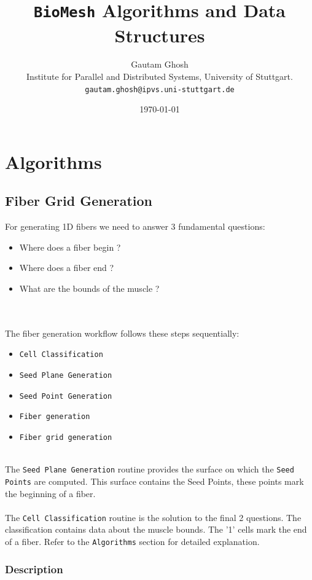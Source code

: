 \documentclass[11pt,a4paper]{article}
\title{%
  \texttt{BioMesh} Algorithms and Data Structures
}
\author{
  Gautam Ghosh\\
  \small Institute for Parallel and Distributed Systems, University of Stuttgart.\\
  \small \texttt{gautam.ghosh@ipvs.uni-stuttgart.de}
}
\date{\today}
\begin{document}
\maketitle

\section{Algorithms}

\subsection{Fiber Grid Generation}

For generating 1D fibers we need to answer 3 fundamental questions:
\begin{itemize}
    \item Where does a fiber begin ?
    \item Where does a fiber end ?
    \item What are the bounds of the muscle ?
\end{itemize}
\\
\\
The fiber generation workflow follows these steps sequentially:

\begin{itemize}
    \item \texttt{Cell Classification}
    \item \texttt{Seed Plane Generation}
    \item \texttt{Seed Point Generation}
    \item \texttt{Fiber generation}
    \item \texttt{Fiber grid generation}
\end{itemize}
\\
The \texttt{Seed Plane Generation} routine provides the surface on which the \texttt{Seed Points} are computed. This surface contains the Seed Points, these points mark the beginning of a fiber.\\
\\
The \texttt{Cell Classification} routine is the solution to the final 2 questions. The classification contains data about the muscle bounds. The '1' cells mark the end of a fiber. Refer to the \texttt{Algorithms} section for detailed explanation.\\

\subsubsection{Description}
\end{document}

